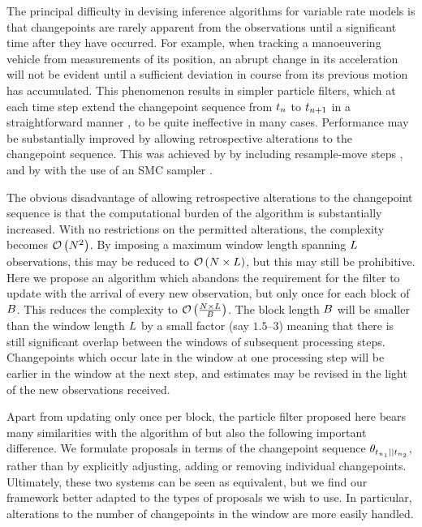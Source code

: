 \documentclass{article}
\begin{document}
The principal difficulty in devising inference algorithms for variable rate models is that changepoints are rarely apparent from the observations until a significant time after they have occurred. For example, when tracking a manoeuvering vehicle from measurements of its position, an abrupt change in its acceleration will not be evident until a sufficient deviation in course from its previous motion has accumulated. This phenomenon results in simpler particle filters, which at each time step extend the changepoint sequence from $t_{n}$ to $t_{n+1}$ in a straightforward manner \citep{Godsill2004a,Godsill2007}, to be quite ineffective in many cases. Performance may be substantially improved by allowing retrospective alterations to the changepoint sequence. This was achieved by \citet{Bunch2013} by including resample-move steps \citep{Gilks2001}, and by \citet{Whiteley2011} with the use of an SMC sampler \citep{DelMoral2006,Doucet2006}.

The obvious disadvantage of allowing retrospective alterations to the changepoint sequence is that the computational burden of the algorithm is substantially increased. With no restrictions on the permitted alterations, the complexity becomes $\mathcal{O}\left({N^2}\right)$. By imposing a maximum window length spanning $L$ observations, this may be reduced to $\mathcal{O}\left({N \times L}\right)$, but this may still be prohibitive. Here we propose an algorithm which abandons the requirement for the filter to update with the arrival of every new observation, but only once for each block of $B$. This reduces the complexity to $\mathcal{O}\left({\frac{N \times L}{B}}\right)$. The block length $B$ will be smaller than the window length $L$ by a small factor (say $1.5$--$3$) meaning that there is still significant overlap between the windows of subsequent processing steps. Changepoints which occur late in the window at one processing step will be earlier in the window at the next step, and estimates may be revised in the light of the new observations received.

Apart from updating only once per block, the particle filter proposed here bears many similarities with the algorithm of \citet{Whiteley2011} but also the following important difference. We formulate proposals in terms of the changepoint sequence $\cp[\ot{\ti_1}]{\ot{\ti_2}}$, rather than by explicitly adjusting, adding or removing individual changepoints. Ultimately, these two systems can be seen as equivalent, but we find our framework better adapted to the types of proposals we wish to use. In particular, alterations to the number of changepoints in the window are more easily handled.
\end{document}
